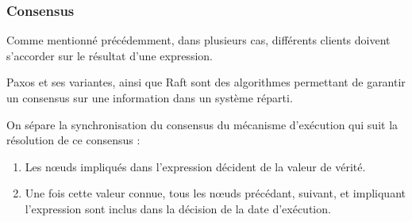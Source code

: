 \documentclass[10pt]{article}
\newcommand\trigger{point d'interaction\xspace}
\begin{document}
\subsubsection{Consensus}\label{section.consensus}
Comme mentionné précédemment, dans plusieurs cas, différents clients doivent s'accorder sur le résultat d'une expression.

Paxos et ses variantes\cite{lamport1998part}, ainsi que Raft\cite{ongaro2014search} sont des algorithmes permettant de garantir un consensus sur une information dans un système réparti. 

On sépare la synchronisation du consensus du mécanisme d'exécution qui suit la résolution de ce consensus : 
\begin{enumerate}
    \item Les nœuds impliqués dans l'expression décident de la valeur de vérité.
    \item Une fois cette valeur connue, tous les nœuds précédant, suivant, et impliquant l'expression sont inclus dans la décision de la date d'exécution.
\end{enumerate}







\end{document}
